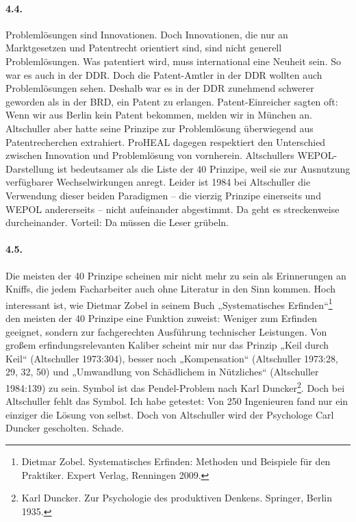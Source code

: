 \documentclass[12pt,a4paper]{article}
\begin{document}
\paragraph{4.4.}
Problemlösungen sind Innovationen. Doch Innovationen, die nur an Marktgesetzen
und Patentrecht orientiert sind, sind nicht generell Problemlösungen.  Was
patentiert wird, muss international eine Neuheit sein. So war es auch in der
DDR. Doch die Patent-Amtler in der DDR wollten auch Problemlösungen sehen.
Deshalb war es in der DDR zunehmend schwerer geworden als in der BRD, ein
Patent zu erlangen. Patent-Einreicher sagten oft: Wenn wir aus Berlin kein
Patent bekommen, melden wir in München an. Altschuller aber hatte seine
Prinzipe zur Problemlösung überwiegend aus Patentrecherchen extrahiert.
ProHEAL dagegen respektiert den Unterschied zwischen Innovation und
Problemlösung von vornherein. Altschullers WEPOL-Darstellung ist bedeutsamer
als die Liste der 40 Prinzipe, weil sie zur Ausnutzung verfügbarer
Wechselwirkungen anregt.  Leider ist 1984 bei Altschuller die Verwendung
dieser beiden Paradigmen – die vierzig Prinzipe einerseits und WEPOL
andererseits – nicht aufeinander abgestimmt. Da geht es streckenweise
durcheinander.  Vorteil: Da müssen die Leser grübeln.

\paragraph{4.5.}
Die meisten der 40 Prinzipe scheinen mir nicht mehr zu sein als Erinnerungen
an Kniffs, die jedem Facharbeiter auch ohne Literatur in den Sinn kommen.
Hoch interessant ist, wie Dietmar Zobel in seinem Buch „Systematisches
Erfinden“\footnote{Dietmar Zobel. Systematisches Erfinden: Methoden und
  Beispiele für den Praktiker. Expert Verlag, Renningen 2009.} den meisten der
40 Prinzipe eine Funktion zuweist: Weniger zum Erfinden geeignet, sondern zur
fachgerechten Ausführung technischer Leistungen. Von großem
erfindungsrelevanten Kaliber scheint mir nur das Prinzip „Keil durch Keil“
(Altschuller 1973:304), besser noch „Kompensation“ (Altschuller 1973:28, 29,
32, 50) und „Umwandlung von Schädlichem in Nützliches“ (Altschuller 1984:139)
zu sein. Symbol ist das Pendel-Problem nach Karl Duncker\footnote{Karl
  Duncker. Zur Psychologie des produktiven Denkens. Springer, Berlin
  1935.}. Doch bei Altschuller fehlt das Symbol.  Ich habe getestet: Von 250
Ingenieuren fand nur ein einziger die Lösung von selbst. Doch von Altschuller
wird der Psychologe Carl Duncker gescholten. Schade.
\end{document}
